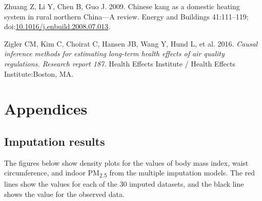 \documentclass[
  letterpaper,
  DIV=11,
  numbers=noendperiod]{scrartcl}
\newlength{\cslhangindent}
\newlength{\cslentryspacingunit} %
\newenvironment{CSLReferences}[2] %
 {%
  \setlength{\parindent}{0pt}
  \ifodd #1
  \let\oldpar\par
  \def\par{\hangindent=\cslhangindent\oldpar}
  \fi
  \setlength{\parskip}{#2\cslentryspacingunit}
 }%
 {}
\begin{document}
\begin{CSLReferences}{1}{0}
\leavevmode{}%
Zhuang Z, Li Y, Chen B, Guo J. 2009. Chinese kang as a domestic heating
system in rural northern {China}---{A} review. Energy and Buildings
41:111--119;
doi:\href{https://doi.org/10.1016/j.enbuild.2008.07.013}{10.1016/j.enbuild.2008.07.013}.

\leavevmode{}%
Zigler CM, Kim C, Choirat C, Hansen JB, Wang Y, Hund L, et al. 2016.
\emph{Causal inference methods for estimating long-term health effects
of air quality regulations. {Research} report 187.} Health Effects
Institute / Health Effects Institute:Boston, MA.

\end{CSLReferences}

\newpage
\appendix
\renewcommand{\thefigure}{A\arabic{figure}}
\renewcommand{\thetable}{A\arabic{table}}
\setcounter{figure}{0}
\setcounter{table}{0}

\hypertarget{appendices}{%
\section{Appendices}\label{appendices}}

\hypertarget{imputation-results}{%
\subsection{Imputation results}\label{imputation-results}}

The figures below show density plots for the values of body mass index,
waist circumference, and indoor PM\textsubscript{2.5} from the multiple
imputation models. The red lines show the values for each of the 30
imputed datasets, and the black line shows the value for the observed
data.
\end{document}
